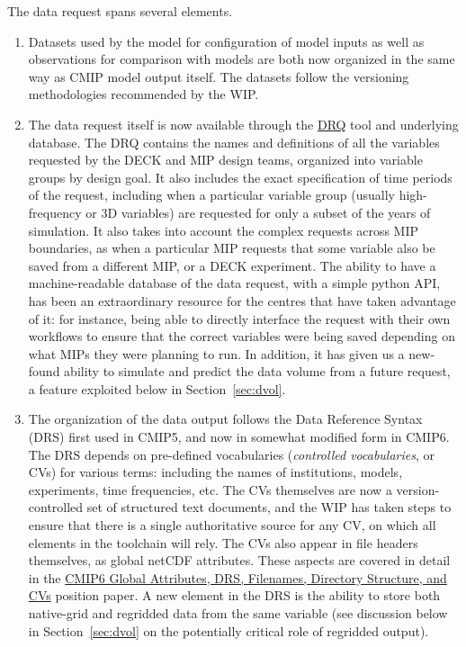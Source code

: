 \documentclass[gmd,manuscript]{copernicus}
\newcommand{\pipref}[1] {\citep{ref:#1}}
\newcommand{\secref}[1] {\mbox{Section  \ref{sec:#1}}}
\begin{document}
The data request spans several elements.

\begin{enumerate}
\item Datasets used by the model for configuration of model inputs
  \citep[\texttt{input4MIPs}, see][]{ref:duracketal2017} as well as
  observations for comparison with models \citep[\texttt{obs4MIPs},
  see][]{ref:teixeiraetal2014} are both now organized in the same way
  as CMIP model output itself. The datasets follow the versioning
  methodologies recommended by the WIP.
\item The data request itself \pipref{juckesetal2015} is now available
  through the \href{https://goo.gl/iNBQ9m}{DRQ} tool and underlying
  database. The DRQ contains the names and definitions of all the
  variables requested by the DECK and MIP design teams, organized into
  variable groups by design goal. It also includes the exact
  specification of time periods of the request, including when a
  particular variable group (usually high-frequency or 3D variables)
  are requested for only a subset of the years of simulation. It also
  takes into account the complex requests across MIP boundaries, as
  when a particular MIP requests that some variable also be saved from
  a different MIP, or a DECK experiment. The ability to have a
  machine-readable database of the data request, with a simple
  python API, has been an extraordinary resource for the centres that
  have taken advantage of it: for instance, being able to directly
  interface the request with their own workflows to ensure that the
  correct variables were being saved depending on what MIPs they were
  planning to run. In addition, it has given us a new-found ability to
  simulate and predict the data volume from a future request, a
  feature exploited below in \secref{dvol}.
\item The organization of the data output follows the Data Reference
  Syntax (DRS) first used in CMIP5, and now in somewhat modified form
  in CMIP6. The DRS depends on pre-defined vocabularies
  (\emph{controlled vocabularies}, or CVs) for various terms:
  including the names of institutions, models, experiments, time
  frequencies, etc. The CVs themselves are now a version-controlled
  set of structured text documents, and the WIP has taken steps to
  ensure that there is a single authoritative source for any CV, on
  which all elements in the toolchain will rely. The CVs also appear
  in file headers themselves, as global netCDF attributes. These
  aspects are covered in detail in the
  \href{https://goo.gl/cMiPE7}{CMIP6 Global Attributes, DRS,
    Filenames, Directory Structure, and CVs} position paper. A new
  element in the DRS is the ability to store both native-grid and
  regridded data from the same variable (see discussion below in
  \secref{dvol} on the potentially critical role of regridded output).
\end{enumerate}
\end{document}
